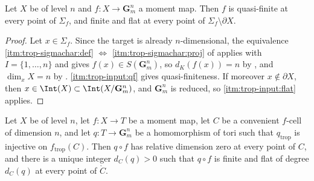 \begin{lemma}
\label{lem:trop-quasifinite-flat}
Let $X$ be of level $n$ and $f:X\to\mathbf G_m^n$ a moment map. Then $f$ is
quasi-finite at every point of $\Sigma_f$, and finite and flat at every
point of $\Sigma_f\setminus\partial X$.
\end{lemma}

\begin{proof}
Let $x\in\Sigma_f$. Since the target is already $n$-dimensional, the
equivalence \cref{itm:trop-sigmachar:def} $\Leftrightarrow$
\cref{itm:trop-sigmachar:proj} of
 applies with $I=\{1,\ldots,n\}$ and
gives $f(x)\in S(\mathbf G_m^n)$, so
$d_K(f(x))=n$ by , and $\dim_xX=n$ by
. 
\cref{itm:trop-input:qf} gives quasi-finiteness. If moreover
$x\notin\partial X$, then $x\in\Int(X)\subset\Int(X/\mathbf G_m^n)$, and
$\mathbf G_m^n$ is reduced, so \cref{itm:trop-input:flat} applies.
\end{proof}

\begin{proposition}
\label{prop:trop-degree-constant}
Let $X$ be of level $n$, let $f:X\to T$ be a moment map, let $C$ be a
convenient $f$-cell of dimension $n$, and let $q:T\to\mathbf G_m^n$ be a
homomorphism of tori such that $q_{\mathrm{trop}}$ is injective on
$f_{\mathrm{trop}}(C)$. Then $q\circ f$ has relative dimension zero at every
point of $C$, and there is a unique integer $d_C(q)>0$ such that $q\circ f$
is finite and flat of degree $d_C(q)$ at every point of $\mathring C$.
\end{proposition}


